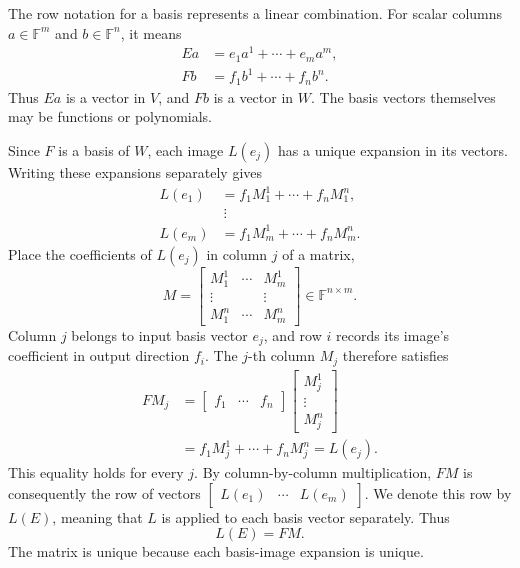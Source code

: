 \begin{pendingreview}
The row notation for a basis represents a linear combination. For scalar
columns \(a\in\mathbb F^m\) and \(b\in\mathbb F^n\), it means
\[
  \begin{aligned}
    Ea&=e_1a^1+\cdots+e_ma^m,\\
    Fb&=f_1b^1+\cdots+f_nb^n.
  \end{aligned}
\]
Thus \(Ea\) is a vector in \(V\), and \(Fb\) is a vector in \(W\).
The basis vectors themselves may be functions or polynomials.

Since \(F\) is a basis of \(W\), each image \(L(e_j)\) has a unique
expansion in its vectors. Writing these expansions separately gives
\[
  \begin{aligned}
    L(e_1)&=f_1M^1_1+\cdots+f_nM^n_1,\\
      &\ \vdots\\
    L(e_m)&=f_1M^1_m+\cdots+f_nM^n_m.
  \end{aligned}
\]
Place the coefficients of \(L(e_j)\) in column \(j\) of a matrix,
\[
  M=\begin{bmatrix}
    M^1_1&\cdots&M^1_m\\
    \vdots&&\vdots\\
    M^n_1&\cdots&M^n_m
  \end{bmatrix}\in\mathbb F^{n\times m}.
\]
Column \(j\) belongs to input basis vector \(e_j\), and row \(i\)
records its image's coefficient in output direction \(f_i\).
The \(j\)-th column \(M_j\) therefore satisfies
\[
  \begin{aligned}
    FM_j&=\begin{bmatrix}f_1&\cdots&f_n\end{bmatrix}
      \begin{bmatrix}M^1_j\\\vdots\\M^n_j\end{bmatrix}\\
      &=f_1M^1_j+\cdots+f_nM^n_j=L(e_j).
  \end{aligned}
\]
This equality holds for every \(j\). By column-by-column multiplication,
\(FM\) is consequently the row of vectors
\(\begin{bmatrix}L(e_1)&\cdots&L(e_m)\end{bmatrix}\).
We denote this row by \(L(E)\), meaning that \(L\) is applied to each
basis vector separately. Thus
\begin{equation}
  L(E)=FM.
  \label{eq:linear-algebra-i:basis-image-matrix}
\end{equation}
The matrix is unique because each basis-image expansion is unique.
\end{pendingreview}

